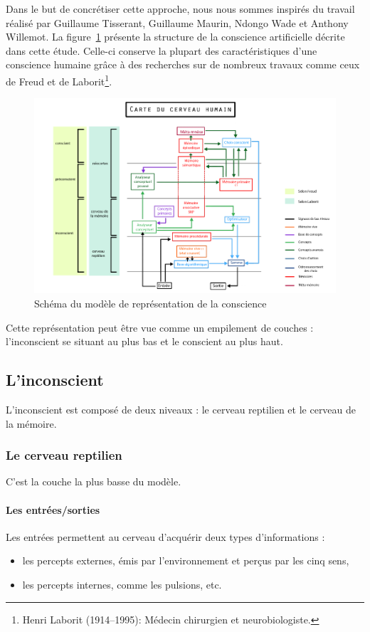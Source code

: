 Dans le but de concrétiser cette approche, nous nous sommes inspirés du travail réalisé par \mbox{Guillaume} \mbox{Tisserant}, \mbox{Guillaume} \mbox{Maurin}, \mbox{Ndongo} \mbox{Wade} et \mbox{Anthony} \mbox{Willemot}. La figure~\ref{modele_original} présente la structure de la conscience artificielle décrite dans cette étude. Celle-ci conserve la plupart des caractéristiques d’une conscience humaine grâce à des recherches sur de nombreux travaux comme ceux de Freud et de Laborit\footnote{Henri Laborit (1914--1995): Médecin chirurgien et neurobiologiste.}.

\begin{figure}[H] 
\centering
\includegraphics[width=\textwidth]{files/modele_original} 
\caption{Schéma du modèle de représentation de la conscience} 
\label{modele_original}
\end{figure}

Cette représentation peut être vue comme un empilement de couches : l'inconscient se situant au plus bas et le conscient au plus haut.

\subsection{L'inconscient}
L'inconscient est composé de deux niveaux : le cerveau reptilien et le cerveau de la mémoire.

\subsubsection{Le cerveau reptilien}

C'est la couche la plus basse du modèle.

\paragraph{Les entrées/sorties}
Les entrées permettent au cerveau d'acquérir deux types d'informations :
\begin{itemize}
\item les percepts externes, émis par l'environnement et perçus par les cinq sens,
\item les percepts internes, comme les pulsions, etc. 
\end{itemize}

